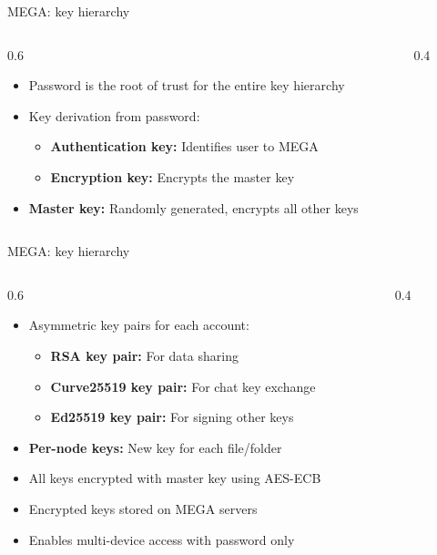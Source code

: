 \ifdefined\PRESENTATION\else\PassOptionsToClass{handout}{beamer}\fi\documentclass[aspectratio=169, lualatex]{beamer}
\begin{document}
\begin{frame}{MEGA: key hierarchy}
	\begin{columns}[c]
		\begin{column}{0.6\textwidth}
			\begin{itemize}
				\item Password is the root of trust for the entire key hierarchy
				\item Key derivation from password:
				      \begin{itemize}
					      \item \textbf{Authentication key:} Identifies user to MEGA
					      \item \textbf{Encryption key:} Encrypts the master key
				      \end{itemize}
				\item \textbf{Master key:} Randomly generated, encrypts all other keys
			\end{itemize}
		\end{column}
		\begin{column}{0.4\textwidth}
		\end{column}
	\end{columns}
\end{frame}

\begin{frame}{MEGA: key hierarchy}
	\begin{columns}[c]
		\begin{column}{0.6\textwidth}
			\begin{itemize}
				\item Asymmetric key pairs for each account:
				      \begin{itemize}
					      \item \textbf{RSA key pair:} For data sharing
					      \item \textbf{Curve25519 key pair:} For chat key exchange
					      \item \textbf{Ed25519 key pair:} For signing other keys
				      \end{itemize}
				\item \textbf{Per-node keys:} New key for each file/folder
				\item All keys encrypted with master key using AES-ECB
				\item Encrypted keys stored on MEGA servers
				\item Enables multi-device access with password only
			\end{itemize}
		\end{column}
		\begin{column}{0.4\textwidth}
		\end{column}
	\end{columns}
\end{frame}
\end{document}
